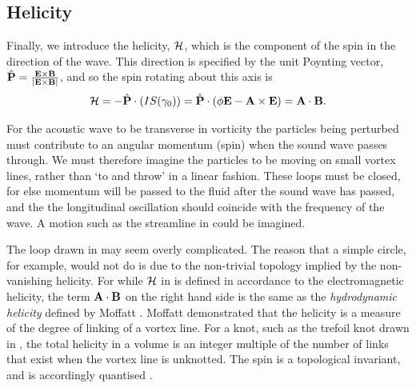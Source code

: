 \subsection{Helicity}
Finally, we introduce the helicity, ${\cal H}$, which is the component of the spin in the direction of the wave.
This direction is specified by the unit Poynting vector,  $\hat{\mathbf{P}} =\frac{\mathbf{E} \times \mathbf{B}}{\left| \mathbf{E}\times\mathbf{B} \right|}$,
and so the  spin rotating about this axis is 
\begin{align}
  \label{eqn:Helicity}
  {\cal H} = - \hat {\mathbf{P}}\cdot \left( I S(\gamma_0) \right) =  \hat {\mathbf{P}} \cdot \left( \phi \mathbf{E} - \textbf{A} \times\mathbf{E} \right) =  \textbf{A} \cdot \mathbf{B}.
\end{align}

For the acoustic wave to be transverse in vorticity the particles being perturbed must contribute to  an angular momentum (spin) when the sound wave passes through.
We must therefore imagine the particles to be moving on small vortex lines, 
rather than `to and throw' in a linear fashion.
These loops must be closed, for else momentum will be passed to the fluid  after the sound wave has passed,
and the the longitudinal oscillation should coincide with the frequency of the wave. 
A motion such as the streamline in  could be imagined.



The loop drawn in  may seem overly complicated.
The reason that a simple circle, for example, 
would not do is due to the non-trivial topology implied by the non-vanishing helicity.
For while ${\cal H}$ in  is defined in accordance to the electromagnetic helicity,
the term $\textbf{A} \cdot \mathbf{B}$ on the right hand side is the same as the 
{\em hydrodynamic helicity} defined by Moffatt \cite{Moffatt1969}.
Moffatt demonstrated that the helicity is a measure of the degree of linking of a vortex line.
For a knot, such as the trefoil knot drawn in , 
the total helicity in a volume is an integer multiple of the number of links 
that exist when the  vortex line is unknotted.
The spin is a topological invariant, and is accordingly quantised
\cite{Moffatt1969, Moffatt1988, Chechkin1993,  Trueba1996, Trueba2000}.


